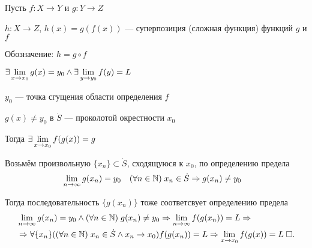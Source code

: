 \documentclass{article}
\begin{document}


Пусть $f:X\to Y$ и $g:Y\to Z$

$h:X\to Z$, $h(x)=g(f(x))$ --- суперпозиция (сложная функция) функций $g$ и $f$

Обозначение: $h=g \circ f$

\theorem

$\exists\lim\limits_{x\to x_0}g(x)=y_0\land\exists\lim\limits_{y\to y_0}f(y)=L$

$y_0$ --- точка сгущения области определения $f$

$g(x)\neq y_0$ в $\dot{S}$ --- проколотой окрестности $x_0$

Тогда $\exists\lim\limits_{x\to x_0}f(g(x))=g$

\proof

Возьмём произвольную $\{x_{n}\}\subset\dot{S}$, сходящуюся к $x_0$, по определению предела
\begin{align*}
	 & \lim\limits_{n\to\infty} g(x_{n})=y_0 &  & (\forall n\in\mathbb{N})\;x_{n}\in\dot{S}\Rightarrow g(x_{n})\neq y_0
\end{align*}

Тогда последовательность $\{g(x_{n})\}$ тоже соответсвует определению предела
\begin{align*}
	 & \lim\limits_{n\to\infty} g(x_{n})=y_0\land(\forall n\in\mathbb{N})\;g(x_{n})\neq y_0\Rightarrow \lim\limits_{n\to\infty} f(g(x_{n}))=L\Rightarrow                               \\
	 & \Rightarrow\forall\{x_{n}\}((\forall n\in\mathbb{N})\;x_{n}\in\dot{S}\land x_{n}\to x_0)f(g(x_{n}))=L\Rightarrow \lim\limits_{x\to x_0}f(g(x))=L\;\square.
\end{align*}
\end{document}
